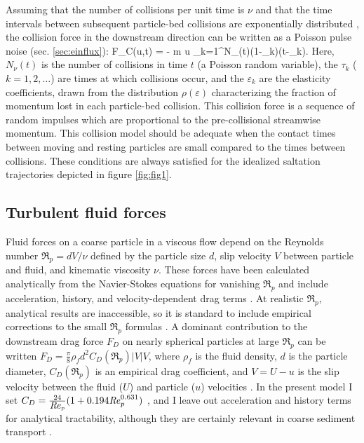 Assuming that the number of collisions per unit time is $\nu$ and that the time intervals between subsequent particle-bed collisions are exponentially distributed \citep{Gordon1972}, the collision force in the downstream direction can be written as a Poisson pulse noise (sec. \ref{sec:einflux}):
\be F_C(u,t) = - m u \sum_{k=1}^{N_\nu(t)}(1-\varepsilon_k)\delta(t-\tau_k). \label{eq:col} \ee
Here, $N_\nu(t)$ is the number of collisions in time $t$ (a Poisson random variable), the $\tau_k$ ($k=1,2,\dots$) are times at which collisions occur, and the $\varepsilon_k$ are the elasticity coefficients, drawn from the distribution $\rho(\varepsilon)$ characterizing the fraction of momentum lost in each particle-bed collision.
This collision force is a sequence of random impulses which are proportional to the pre-collisional streamwise momentum. This collision model should be adequate when the contact times between moving and resting particles are small compared to the times between collisions. These conditions are always satisfied for the idealized saltation trajectories depicted in figure \ref{fig:fig1}.

\subsection{Turbulent fluid forces}
Fluid forces on a coarse particle in a viscous flow depend on the Reynolds number $\Re_p = d V/\nu$ defined by the particle size $d$, slip velocity $V$ between particle and fluid, and kinematic viscosity $\nu$.
These forces have been calculated analytically from the Navier-Stokes equations for vanishing $\Re_p$ and include acceleration, history, and velocity-dependent drag terms \citep{Hjelmfelt1966, Maxey1983, Auton1987}.
At realistic $\Re_p$, analytical results are inaccessible, so it is standard to include empirical corrections to the small $\Re_p$ formulas \citep{Schmeeckle2007,Clift1978}.
A dominant contribution to the downstream drag force $F_D$ on nearly spherical particles at large $\Re_p$ can be written $F_D = \frac{\pi}{8}
\rho_f d^2 C_D(\Re_p) |V|V$, where $\rho_f$ is the fluid density, $d$ is the particle diameter, $C_D(\Re_p)$ is an empirical drag coefficient, and $V = U-u$ is the slip velocity between the fluid ($U$) and particle ($u$) velocities \citep{Coleman1967, Schmeeckle2007, Dwivedi2012}.
In the present model I set $C_D = \frac{24}{\mbox{\textit{Re}}_p}( 1 + 0.194 \mbox{\textit{Re}}_p^{0.631})$ \citep{Clift1978,Gonzalez2017}, and I leave out acceleration and history terms for analytical tractability, although they are certainly relevant in coarse sediment transport \citep{Michaelides1997,Armenio2001}.

